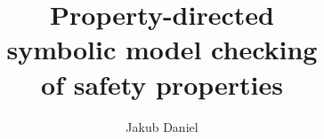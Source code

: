 \documentclass[d3s]{beamer}
\title{Property-directed \\ symbolic model checking \\ of safety properties}
\author{Jakub Daniel}
\begin{document}
\titleframe
\end{document}
